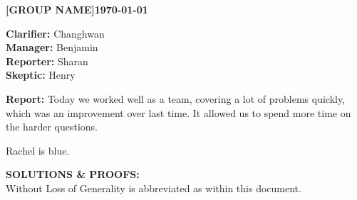 \documentclass[11pt]{article}
\newcommand{\teamname}{[GROUP NAME]}
\newcommand{\reportdate}{\today}
\begin{document}
\thispagestyle{firstpage}

\noindent\textbf{\teamname}\hfill\textbf{\reportdate}

\noindent\textbf{Clarifier:} Changhwan\\
\textbf{Manager:} Benjamin\\
\textbf{Reporter:} Sharan\\
\textbf{Skeptic:} Henry

\textbf{Report:} Today we worked well as a team, covering a lot of problems quickly, which was an improvement over last time. It allowed us to spend more time on the harder questions.


\divider

\color{blue}Rachel is blue. \color{black}

\textbf{SOLUTIONS \& PROOFS:}\\
Without Loss of Generality is abbreviated as \WLoG{} within this document.
\end{document}
